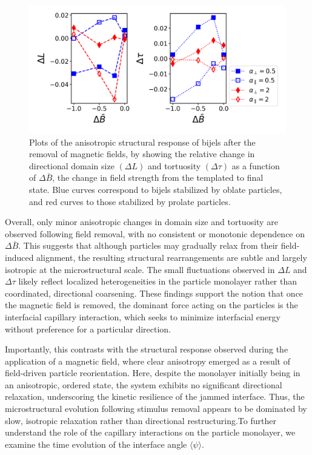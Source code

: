 \begin{figure} 
\centering 
\includegraphics[scale = 0.5]{../figures/results/paper2/domain_size_aniso-field_down.png} 
\caption{Plots of the anisotropic structural response of bijels after the removal of 
         magnetic fields, by showing the relative change in directional domain size \((\Delta L)\) and tortuosity \((\Delta \tau)\) 
         as a function of \(\Delta \bar{B}\), the change in field strength from the templated to final state. Blue curves correspond 
         to bijels stabilized by oblate particles, and red curves to those stabilized by prolate particles.} 
\label{fig:domain_size_aniso-field_down} 
\end{figure}

Overall, only minor anisotropic changes in domain size and tortuosity are observed following field removal, with no consistent 
or monotonic dependence on \(\Delta \bar{B}\). This suggests that although particles may gradually relax from their field-induced 
alignment, the resulting structural rearrangements are subtle and largely isotropic at the microstructural scale. The small 
fluctuations observed in \(\Delta L\) and \(\Delta \tau\) likely reflect localized heterogeneities in the particle monolayer 
rather than coordinated, directional coarsening. These findings support the notion that once the magnetic field is removed, 
the dominant force acting on the particles is the interfacial capillary interaction, which seeks to minimize interfacial 
energy without preference for a particular direction.

Importantly, this contrasts with the structural response observed during the application of a magnetic field, where clear 
anisotropy emerged as a result of field-driven particle reorientation. Here, despite the monolayer initially being in an 
anisotropic, ordered state, the system exhibits no significant directional relaxation, underscoring the kinetic resilience 
of the jammed interface. Thus, the microstructural evolution following stimulus removal appears to be dominated by slow, 
isotropic relaxation rather than directional restructuring.To further understand the role of the capillary interactions on the 
particle monolayer, we examine the time evolution of the interface angle \(\langle \psi \rangle\). 

